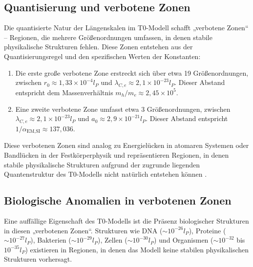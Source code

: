 \documentclass[twocolumn,aps,prl]{revtex4-2}
\begin{document}
{{{{{{{{{										\subsection{Quantisierung und verbotene Zonen}
										\label{subsec:quantization}
										
										Die quantisierte Natur der Längenskalen im T0-Modell schafft „verbotene Zonen“ – Regionen, die mehrere Größenordnungen umfassen, in denen stabile physikalische Strukturen fehlen. Diese Zonen entstehen aus der Quantisierungsregel und den spezifischen Werten der Konstanten:
										
										\begin{enumerate}
											\item Die erste große verbotene Zone erstreckt sich über etwa 19 Größenordnungen, zwischen \(r_0 \approx 1{,}33 \times 10^{-4} l_P\) und \(\lambda_{C,e} \approx 2{,}1 \times 10^{-23} l_P\). Dieser Abstand entspricht dem Massenverhältnis \(m_h/m_e \approx 2{,}45 \times 10^5\).
											\item Eine zweite verbotene Zone umfasst etwa 3 Größenordnungen, zwischen \(\lambda_{C,e} \approx 2{,}1 \times 10^{-23} l_P\) und \(a_0 \approx 2{,}9 \times 10^{-21} l_P\). Dieser Abstand entspricht \(1/\alpha_{\text{EM,SI}} \approx 137{,}036\).
										\end{enumerate}
										
										Diese verbotenen Zonen sind analog zu Energielücken in atomaren Systemen oder Bandlücken in der Festkörperphysik und repräsentieren Regionen, in denen stabile physikalische Strukturen aufgrund der zugrunde liegenden Quantenstruktur des T0-Modells nicht natürlich entstehen können \cite{pascher_higgs_2025}.
										
										\subsection{Biologische Anomalien in verbotenen Zonen}
										\label{subsec:bio_anomalies}
										
										Eine auffällige Eigenschaft des T0-Modells ist die Präsenz biologischer Strukturen in diesen „verbotenen Zonen“. Strukturen wie DNA (\(\sim 10^{-26} l_P\)), Proteine (\(\sim 10^{-27} l_P\)), Bakterien (\(\sim 10^{-29} l_P\)), Zellen (\(\sim 10^{-30} l_P\)) und Organismen (\(\sim 10^{-32}\) bis \(10^{-35} l_P\)) existieren in Regionen, in denen das Modell keine stabilen physikalischen Strukturen vorhersagt.
										
}}}}}}}}}
\end{document}
